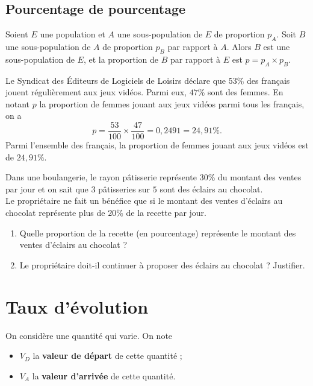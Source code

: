 \documentclass[11pt]{article}
\begin{document}
\subsection{Pourcentage de pourcentage}
\begin{prop}
  Soient $E$ une population et $A$ une sous-population de $E$ de proportion
  $p_A$. Soit $B$ une sous-population de $A$ de proportion $p_B$ par rapport à
  $A$. Alors $B$ est une sous-population de $E$, et la proportion de $B$ par
  rapport à $E$ est $p=p_A\times p_B$.
\end{prop}
\begin{exemple}
  Le Syndicat des Éditeurs de Logiciels de Loisirs déclare que $53$\% des
  français jouent régulièrement aux jeux vidéos. Parmi eux, $47$\% sont des
  femmes. En notant $p$ la proportion de femmes jouant aux jeux vidéos parmi
  tous les français, on a
  \[
    p = \frac{53}{100}\times\frac{47}{100} = 0,2491 = 24,91\%.
  \]
  Parmi l'ensemble des français, la proportion de femmes jouant aux jeux vidéos
  est de $24,91\%$.
\end{exemple}
\begin{app}
  Dans une boulangerie, le rayon p\^atisserie représente $30$\% du montant des
  ventes par jour et on sait que $3$ p\^atisseries sur $5$ sont des éclairs au
  chocolat.\\
  Le propriétaire ne fait un bénéfice que si le montant des ventes d'éclairs au
  chocolat représente plus de $20$\% de la recette par jour.
  \begin{enumerate}
    \item Quelle proportion de la recette (en pourcentage) représente le montant
      des ventes d'éclairs au chocolat ?
    \item Le propriétaire doit-il continuer à proposer des éclairs au chocolat ?
      Justifier.
  \end{enumerate}
\end{app}

\section{Taux d'évolution}
On considère une quantité qui varie. On note
\begin{itemize}
  \item $V_D$ la \textbf{valeur de départ} de cette quantité ;
  \item $V_A$ la \textbf{valeur d'arrivée} de cette quantité.
\end{itemize}
\end{document}
